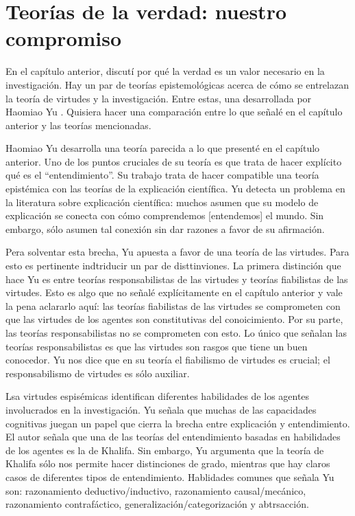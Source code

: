 \chapter{Teorías de la verdad: nuestro compromiso}

En el capítulo anterior, discutí por qué la verdad es un valor necesario en la investigación. Hay un par de teorías epistemológicas acerca de cómo se entrelazan la teoría de virtudes y la investigación. Entre estas, una desarrollada por Haomiao Yu \citeyear{Yu2021}. Quisiera hacer una comparación entre lo que señalé en el capítulo anterior y las teorías mencionadas.

Haomiao Yu desarrolla una teoría parecida a lo que presenté en el capítulo anterior. Uno de los puntos cruciales de su teoría es que trata de hacer explícito qué es el ``entendimiento''. Su trabajo trata de hacer compatible una teoría epistémica con las teorías de la explicación científica. Yu detecta un problema en la literatura sobre explicación científica: muchos asumen que su modelo de explicación se conecta con cómo comprendemos [entendemos] el mundo. Sin embargo, sólo asumen tal conexión sin dar razones a favor de su afirmación.

Pera solventar esta brecha, Yu apuesta a favor de una teoría de las virtudes. Para esto es pertinente indtriducir un par de disttinviones. La primera distinción que hace Yu es entre teorías responsabilistas de las virtudes y teorías fiabilistas de las virtudes. Esto es algo que no señalé explícitamente en el capítulo anterior y vale la pena aclararlo aquí: las teorías fiabilistas de las virtudes se comprometen con que las virtudes de los agentes son constitutivas del conoicimiento. Por su parte, las teorías responsabilistas no se comprometen con esto. Lo único que señalan las teorías responsabilistas es que las virtudes son rasgos que tiene un buen conocedor. Yu nos dice que en su teoría el fiabilismo de virtudes es crucial; el responsabilismo de virtudes es sólo auxiliar.

Lsa virtudes espisémicas identifican diferentes habilidades de los agentes involucrados en la investigación. Yu señala que muchas de las capacidades cognitivas juegan un papel que cierra la brecha entre explicación y entendimiento. El autor señala que una de las teorías del entendimiento basadas en habilidades de los agentes es la de Khalifa. Sin embargo, Yu argumenta que la teoría de Khalifa sólo nos permite hacer distinciones de grado, mientras que hay claros casos de diferentes tipos de entendimiento. Hablidades comunes que señala Yu son: razonamiento deductivo/inductivo, razonamiento causal/mecánico, razonamiento contrafáctico, generalización/categorización y abtrsacción. 

